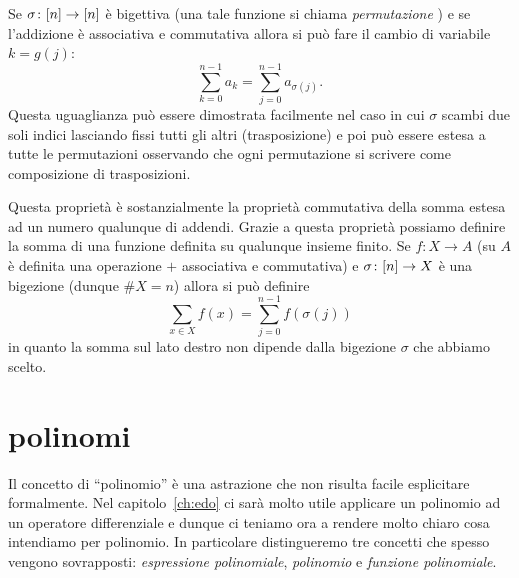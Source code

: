 Se $\sigma\colon {\left[ n \right]} \to {\left[ n \right]}$
è bigettiva (una tale funzione si chiama \emph{permutazione}%
%
)
e se l'addizione è associativa e commutativa
allora si può fare il cambio di variabile $k=g(j)$:
\[
    \sum_{k=0}^{n-1} a_k = \sum_{j=0}^{n-1} a_{\sigma(j)}.
\]
Questa uguaglianza può essere dimostrata facilmente nel caso 
in cui $\sigma$ scambi due soli indici lasciando fissi tutti gli altri 
(trasposizione) e poi può essere estesa a tutte le permutazioni
osservando che ogni permutazione si scrivere come composizione 
di trasposizioni.

Questa proprietà è sostanzialmente la proprietà commutativa della somma 
estesa ad un numero qualunque di addendi.
Grazie a questa proprietà possiamo definire la somma di una funzione 
definita su qualunque insieme finito. 
Se $f\colon X \to A$ 
(su $A$ è definita una operazione $+$ associativa e commutativa)
e $\sigma\colon {\left[ n \right]} \to X$ è una bigezione (dunque $\#X = n$)
allora si può definire 
\[
  \sum_{x\in X} f(x) = \sum_{j=0}^{n-1} f(\sigma(j))  
\]
in quanto la somma sul lato destro non dipende dalla bigezione $\sigma$ che 
abbiamo scelto.

\section{polinomi}
\label{ch:polinomi}

Il concetto di ``polinomio'' è una astrazione che non risulta facile esplicitare formalmente.
Nel capitolo~\ref{ch:edo} ci sarà molto utile applicare un polinomio ad un operatore 
differenziale e dunque ci teniamo ora a rendere molto chiaro cosa intendiamo per polinomio.
In particolare distingueremo tre concetti che spesso vengono sovrapposti: 
\emph{espressione polinomiale}, \emph{polinomio} e \emph{funzione polinomiale}.

